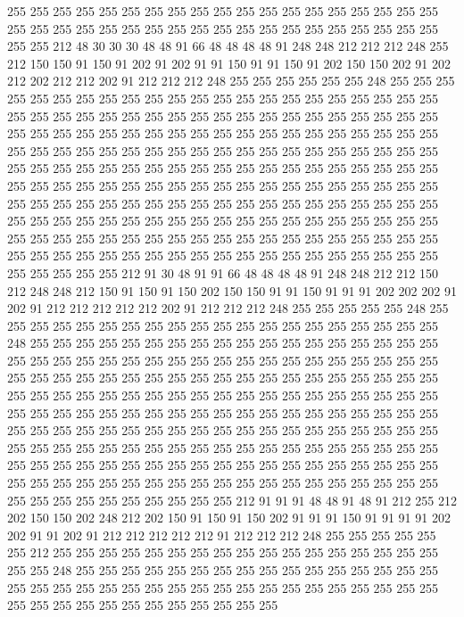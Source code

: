 255 255 255 255 255 255 255 255 255 255 255 255 255 255 255 255 255 255 255 255
255 255 255 255 255 255 255 255 255 255 255 255 255 255 255 255 255 255 255 255
212 48 30 30 30 48 48 91 66 48 48 48 48 91 248 248 212 212 212 248
255 212 150 150 91 150 91 202 91 202 91 91 150 91 91 150 91 202 150 150
202 91 202 212 202 212 212 202 91 212 212 212 248 255 255 255 255 255 255 248
255 255 255 255 255 255 255 255 255 255 255 255 255 255 255 255 255 255 255 255
255 255 255 255 255 255 255 255 255 255 255 255 255 255 255 255 255 255 255 255
255 255 255 255 255 255 255 255 255 255 255 255 255 255 255 255 255 255 255 255
255 255 255 255 255 255 255 255 255 255 255 255 255 255 255 255 255 255 255 255
255 255 255 255 255 255 255 255 255 255 255 255 255 255 255 255 255 255 255 255
255 255 255 255 255 255 255 255 255 255 255 255 255 255 255 255 255 255 255 255
255 255 255 255 255 255 255 255 255 255 255 255 255 255 255 255 255 255 255 255
255 255 255 255 255 255 255 255 255 255 255 255 255 255 255 255 255 255 255 255
255 255 255 255 255 255 255 255 255 255 255 255 255 255 255 255 255 255 255 255
255 255 255 255 255 255 255 255 255 255 255 255 255 255 255 255 255 255 212 91
30 48 91 91 66 48 48 48 48 91 248 248 212 212 150 212 248 248 212 150
91 150 91 150 202 150 150 91 91 150 91 91 91 202 202 202 91 202 91 212
212 212 212 212 202 91 212 212 212 248 255 255 255 255 255 248 255 255 255 255
255 255 255 255 255 255 255 255 255 255 255 255 255 255 255 255 248 255 255 255
255 255 255 255 255 255 255 255 255 255 255 255 255 255 255 255 255 255 255 255
255 255 255 255 255 255 255 255 255 255 255 255 255 255 255 255 255 255 255 255
255 255 255 255 255 255 255 255 255 255 255 255 255 255 255 255 255 255 255 255
255 255 255 255 255 255 255 255 255 255 255 255 255 255 255 255 255 255 255 255
255 255 255 255 255 255 255 255 255 255 255 255 255 255 255 255 255 255 255 255
255 255 255 255 255 255 255 255 255 255 255 255 255 255 255 255 255 255 255 255
255 255 255 255 255 255 255 255 255 255 255 255 255 255 255 255 255 255 255 255
255 255 255 255 255 255 255 255 255 255 255 255 255 255 255 255 255 255 255 255
255 255 255 255 255 255 255 255 255 255 255 255 255 255 255 255 255 212 91 91
91 48 48 91 48 91 212 255 212 202 150 150 202 248 212 202 150 91 150 91
150 202 91 91 91 150 91 91 91 91 202 202 91 91 202 91 212 212 212 212
212 91 212 212 212 248 255 255 255 255 255 255 212 255 255 255 255 255 255 255
255 255 255 255 255 255 255 255 255 255 255 255 248 255 255 255 255 255 255 255
255 255 255 255 255 255 255 255 255 255 255 255 255 255 255 255 255 255 255 255
255 255 255 255 255 255 255 255 255 255 255 255 255 255 255 255 255 255 255 255
